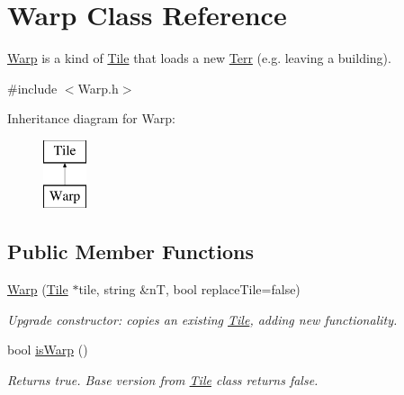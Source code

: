 \hypertarget{class_warp}{}\section{Warp Class Reference}
\label{class_warp}


\hyperlink{class_warp}{Warp} is a kind of \hyperlink{class_tile}{Tile} that loads a new \hyperlink{class_terr}{Terr} (e.\+g. leaving a building).  




{\ttfamily \#include $<$Warp.\+h$>$}

Inheritance diagram for Warp\+:\begin{figure}[H]
\begin{center}
\leavevmode
\includegraphics[height=2.000000cm]{class_warp}
\end{center}
\end{figure}
\subsection*{Public Member Functions}
\begin{DoxyCompactItemize}
\item 
\hyperlink{class_warp_ab3dc6510e257e6ce5f621c7201430c62}{Warp} (\hyperlink{class_tile}{Tile} $\ast$tile, string \&nT, bool replace\+Tile=false)\hypertarget{class_warp_ab3dc6510e257e6ce5f621c7201430c62}{}\label{class_warp_ab3dc6510e257e6ce5f621c7201430c62}

\begin{DoxyCompactList}\small\item\em Upgrade constructor\+: copies an existing \hyperlink{class_tile}{Tile}, adding new functionality. \end{DoxyCompactList}\item 
bool \hyperlink{class_warp_afeef2dc57c6560c8360553c4931d8f35}{is\+Warp} ()\hypertarget{class_warp_afeef2dc57c6560c8360553c4931d8f35}{}\label{class_warp_afeef2dc57c6560c8360553c4931d8f35}

\begin{DoxyCompactList}\small\item\em Returns true. Base version from \hyperlink{class_tile}{Tile} class returns false. \end{DoxyCompactList}\end{DoxyCompactItemize}
